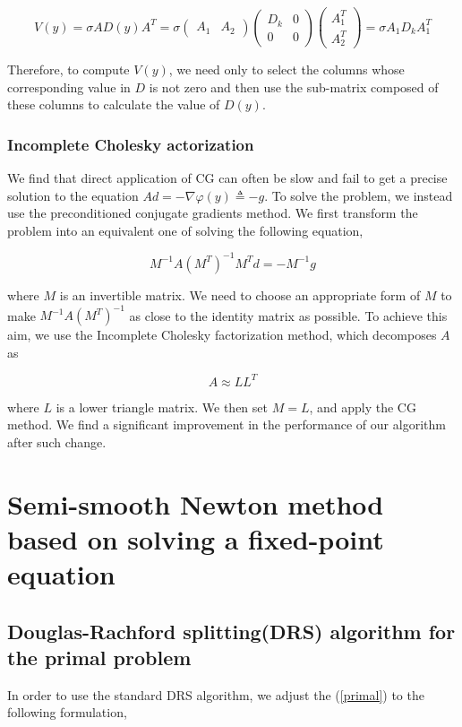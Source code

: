 \documentclass[a4paper]{article}
\begin{document}
\begin{displaymath}
V(y) = \sigma AD(y)A^T =  \sigma \begin{pmatrix}
A_1 & A_2
\end{pmatrix} 
\begin{pmatrix}
D_k & 0\\
0 & 0
\end{pmatrix}
\begin{pmatrix}
A_1^T\\
A_2^T
\end{pmatrix} = \sigma A_1 D_k A_1^T
\end{displaymath}

Therefore, to compute $V(y)$, we need only to select the columns whose corresponding value in $D$ is not zero and then use the sub-matrix composed of these columns to calculate the value of $D(y)$. 

\subsubsection{Incomplete Cholesky actorization}
We find that direct application of CG can often be slow and fail to get a precise solution to the equation $Ad = -\nabla\varphi(y) \triangleq -g$. To solve the problem, we instead use the preconditioned conjugate gradients method. We first transform the problem into an equivalent one of solving the following equation, 

\begin{displaymath}
M^{-1}A(M^T)^{-1}M^Td = - M^{-1}g
\end{displaymath}

where $M$ is an invertible matrix. We need to choose an appropriate form of $M$ to make $M^{-1}A(M^T)^{-1}$ as close to the identity matrix as possible. To achieve this aim, we use the Incomplete Cholesky factorization method, which decomposes $A$ as 

\begin{equation}
A \approx LL^T
\end{equation}

where $L$ is a lower triangle matrix. We then set $M= L$, and apply the CG method. We find a significant improvement in the performance of our algorithm after such change. 


\section{Semi-smooth Newton method based on solving a fixed-point equation}
\subsection{Douglas-Rachford splitting(DRS) algorithm for the primal problem}
In order to use the standard DRS algorithm, we adjust the (\ref{primal}) to the following formulation, 
\end{document}
